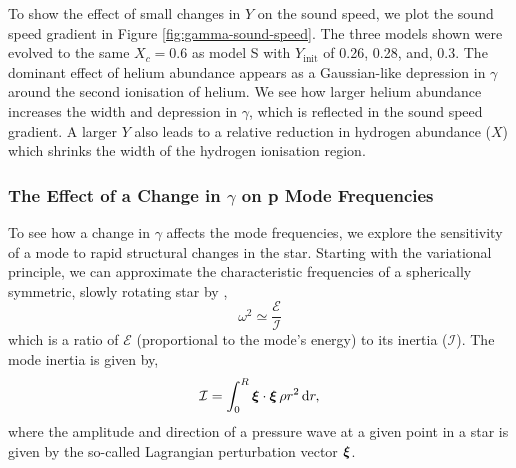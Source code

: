 To show the effect of small changes in \(Y\) on the sound speed, we plot the sound speed gradient in Figure \ref{fig:gamma-sound-speed}. The three models shown were evolved to the same \(X_c = 0.6\) as model S with \(Y_\mathrm{init}\) of 0.26, 0.28, and, 0.3. The dominant effect of helium abundance appears as a Gaussian-like depression in \(\gamma\) around the second ionisation of helium. We see how larger helium abundance increases the width and depression in \(\gamma\), which is reflected in the sound speed gradient. A larger \(Y\) also leads to a relative reduction in hydrogen abundance (\(X\)) which shrinks the width of the hydrogen ionisation region.

\subsubsection{The Effect of a Change in \(\gamma\) on p Mode Frequencies}

To see how a change in \(\gamma\) affects the mode frequencies, we explore the sensitivity of a mode to rapid structural changes in the star. Starting with the variational principle, we can approximate the characteristic frequencies of a spherically symmetric, slowly rotating star by \citep{Chandrasekhar1964},
%
\begin{equation}
    \omega^2 \simeq \frac{\mathcal{E}}{\mathcal{I}}\label{eq:var-prin}
\end{equation}
%
which is a ratio of \(\mathcal{E}\) (proportional to the mode's energy)
%
%
to its inertia (\(\mathcal{I}\)). The mode inertia is given by,
%
\begin{equation}
    \mathcal{I} = \int_0^R \bm{\xi} \cdot \bm{\xi} \, \rho r^2 \, \mathrm{d} r,
\end{equation}
%
where the amplitude and direction of a pressure wave at a given point in a star is given by the so-called Lagrangian perturbation vector \(\bm{\xi}\). 

